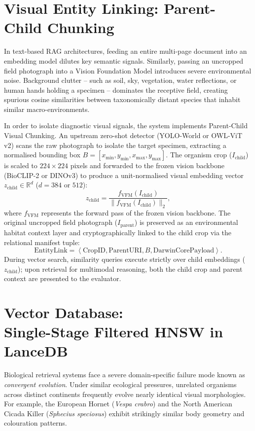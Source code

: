\section{Visual Entity Linking: Parent-Child Chunking}
\label{sec:parent_child_chunking}

In text-based RAG architectures, feeding an entire multi-page document into an embedding model dilutes key semantic signals. Similarly, passing an uncropped field photograph into a Vision Foundation Model introduces severe environmental noise. Background clutter -- such as soil, sky, vegetation, water reflections, or human hands holding a specimen -- dominates the receptive field, creating spurious cosine similarities between taxonomically distant species that inhabit similar macro-environments.

In order to isolate diagnostic visual signals, the system implements Parent-Child Visual Chunking. An upstream zero-shot detector (YOLO-World or OWL-ViT v2) scans the raw photograph to isolate the target specimen, extracting a normalised bounding box $B = [x_{\min}, y_{\min}, x_{\max}, y_{\max}]$. The organism crop ($I_{\text{child}}$) is scaled to $224 \times 224$ pixels and forwarded to the frozen vision backbone (BioCLIP-2 or DINOv3) to produce a unit-normalised visual embedding vector $z_{\text{child}} \in \mathbb{R}^d$ ($d=384$ or $512$):
\[
z_{\text{child}} = \frac{f_{\text{VFM}}(I_{\text{child}})}{\|f_{\text{VFM}}(I_{\text{child}})\|_2},
\]
where $f_{\text{VFM}}$ represents the forward pass of the frozen vision backbone. The original uncropped field photograph ($I_{\text{parent}}$) is preserved as an environmental habitat context layer and cryptographically linked to the child crop via the relational manifest tuple:
\[
\text{EntityLink} = \left\langle \text{CropID}, \text{ParentURI}, B, \text{DarwinCorePayload} \right\rangle.
\]
During vector search, similarity queries execute strictly over child embeddings ($z_{\text{child}}$); upon retrieval for multimodal reasoning, both the child crop and parent context are presented to the evaluator.

\section[Single-Stage Filtered HNSW in LanceDB]{Vector Database:\\ Single-Stage Filtered HNSW in LanceDB}
\label{sec:filtered_hnsw}

Biological retrieval systems face a severe domain-specific failure mode known as \textit{convergent evolution}. Under similar ecological pressures, unrelated organisms across distinct continents frequently evolve nearly identical visual morphologies. For example, the European Hornet (\textit{Vespa crabro}) and the North American Cicada Killer (\textit{Sphecius speciosus}) exhibit strikingly similar body geometry and colouration patterns.

